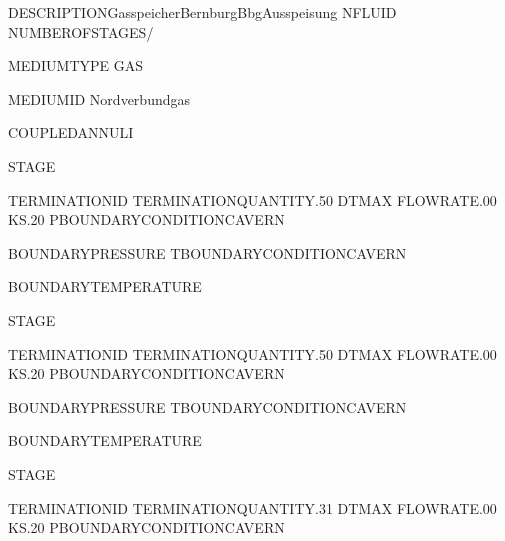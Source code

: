 \documentclass[letterpaper,10pt,english]{sphinxmanual}
\begin{document}
\begin{sphinxVerbatim}[commandchars=\\\{\}]
DESCRIPTIONGasspeicherBernburgBbgAusspeisung
N\PYGZus{}FLUID
NUMBER\PYGZus{}OF\PYGZus{}STAGES\PYG{o}{[}/\PYG{o}{]}

MEDIUM\PYGZus{}TYPE
GAS

MEDIUM\PYGZus{}ID
Nordverbundgas

COUPLED\PYGZus{}ANNULI



STAGE

TERMINATION\PYGZus{}ID
TERMINATION\PYGZus{}QUANTITY.50
DT\PYGZus{}MAX
FLOW\PYGZus{}RATE.00
K\PYGZus{}S.20
P\PYGZus{}BOUNDARY\PYGZus{}CONDITIONCAVERN

BOUNDARY\PYGZus{}PRESSURE
T\PYGZus{}BOUNDARY\PYGZus{}CONDITIONCAVERN

BOUNDARY\PYGZus{}TEMPERATURE

STAGE

TERMINATION\PYGZus{}ID
TERMINATION\PYGZus{}QUANTITY.50
DT\PYGZus{}MAX
FLOW\PYGZus{}RATE.00
K\PYGZus{}S.20
P\PYGZus{}BOUNDARY\PYGZus{}CONDITIONCAVERN

BOUNDARY\PYGZus{}PRESSURE
T\PYGZus{}BOUNDARY\PYGZus{}CONDITIONCAVERN

BOUNDARY\PYGZus{}TEMPERATURE

STAGE

TERMINATION\PYGZus{}ID
TERMINATION\PYGZus{}QUANTITY.31
DT\PYGZus{}MAX
FLOW\PYGZus{}RATE.00
K\PYGZus{}S.20
P\PYGZus{}BOUNDARY\PYGZus{}CONDITIONCAVERN


\end{sphinxVerbatim}
\end{document}
